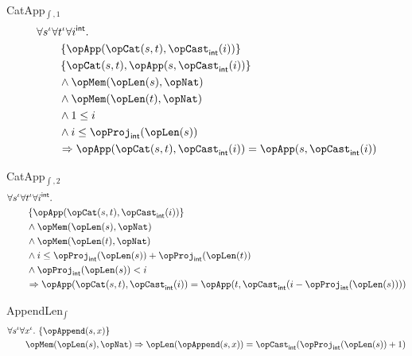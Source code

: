 \documentclass[11pt, a4paper, oneside]{article}
\begin{document}
\begin{axioms}
\item[CatApp$_{\int,1}$] \[
        \begin{aligned}
            &\forall s^\idv \forall t^\idv \forall i^\int. \\
            &\qquad \st{ \opApp(\opCat(s, t), \opCast_\int(i)) } \\
            &\qquad \st{ \opCat(s, t), \opApp(s, \opCast_\int(i)) } \\
            &\qquad \wedge \opMem(\opLen(s), \opNat) \\
            &\qquad \wedge \opMem(\opLen(t), \opNat) \\
            &\qquad \wedge 1 \le i \\
            &\qquad \wedge i \le \opProj_\int(\opLen(s)) \\
            &\qquad \imp \opApp(\opCat(s, t), \opCast_\int(i)) = \opApp(s, \opCast_\int(i))
        \end{aligned}
    \]

\item[CatApp$_{\int,2}$] \[
        \begin{aligned}
            &\forall s^\idv \forall t^\idv \forall i^\int. \\
            &\qquad \st{ \opApp(\opCat(s, t), \opCast_\int(i)) } \\
            &\qquad \wedge \opMem(\opLen(s), \opNat) \\
            &\qquad \wedge \opMem(\opLen(t), \opNat) \\
            &\qquad \wedge i \le \opProj_\int(\opLen(s)) + \opProj_\int(\opLen(t)) \\
            &\qquad \wedge \opProj_\int(\opLen(s)) < i \\
            &\qquad \imp \opApp(\opCat(s, t), \opCast_\int(i)) = \opApp(t, \opCast_\int(i - \opProj_\int(\opLen(s))))
        \end{aligned}
    \]

\item[AppendLen$_\int$] \[
        \begin{aligned}
            &\forall s^\idv \forall x^\idv.\, \st{ \opAppend(s, x) } \\
            &\qquad \opMem(\opLen(s), \opNat) \imp \opLen(\opAppend(s, x)) = \opCast_\int(\opProj_\int(\opLen(s)) + 1)
        \end{aligned}
    \]


\end{axioms}
\end{document}
